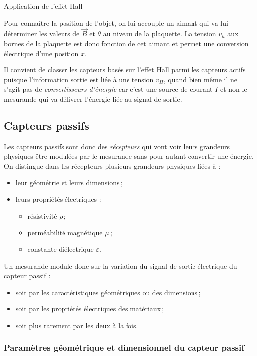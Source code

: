 \begin{exemple}{Application de l'effet Hall}{}
\begin{figure}[H]
\begin{tikzpicture}[x=0.75pt,y=0.75pt,yscale=-1,xscale=1]
\end{tikzpicture}
\end{figure}
Pour connaître la position de l'objet, on lui accouple un aimant qui va lui déterminer les valeurs de $\overrightarrow{B}$ et $\theta$ au niveau de la plaquette. La tension $v_{h}$ aux bornes de la plaquette est donc fonction de cet aimant et permet une conversion électrique d'une position $x$.
\end{exemple}



Il convient de classer les capteurs basés sur l'effet Hall parmi les capteurs actifs puisque l'information sortie est liée à une tension $v_H$, quand bien même il ne s'agit pas de \emph{convertisseurs d'énergie} car c'est une source de courant $I$  et non le mesurande qui va délivrer l'énergie liée au signal de sortie.

\subsection{Capteurs passifs}

Les capteurs passifs sont donc des \emph{récepteurs} qui vont voir leurs grandeurs physiques être modulées par le mesurande sans pour autant convertir une énergie. On distingue dans les récepteurs plusieurs grandeurs physiques liées à :
\begin{itemize}
\item leur géométrie et leurs dimensions\,;
\item leurs propriétés électriques :
\begin{itemize}
\item résistivité $\rho$\,;
\item perméabilité magnétique $\mu$\,;
\item constante diélectrique $\varepsilon$.
\end{itemize}
\end{itemize}

Un mesurande module donc sur la variation du signal de sortie électrique du capteur passif :
\begin{itemize}
\item soit par les caractéristiques géométriques ou des dimensions\,;
\item soit par les propriétés électriques des matériaux\,;
\item soit plus rarement par les deux à la fois.
\end{itemize}

\subsubsection{Paramètres géométrique et dimensionnel du capteur passif}

